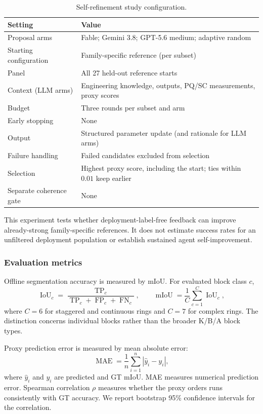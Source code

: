 \documentclass[a4paper,fleqn]{cas-dc}
\begin{document}
{\begin{table}[ht]
\caption{Self-refinement study configuration.}
\label{tab:poc-config}
\centering
\begin{tabular}{p{} p{}}
\toprule
Setting & Value \\
\midrule
Proposal arms & Fable; Gemini 3.8; GPT-5.6 medium; adaptive random \\
Starting configuration & Family-specific reference (per subset) \\
Panel & All 27 held-out reference starts \\
Context (LLM arms) & Engineering knowledge, outputs, PQ/SC measurements, proxy scores \\
Budget & Three rounds per subset and arm \\
Early stopping & None \\
Output & Structured parameter update (and rationale for LLM arms) \\
Failure handling & Failed candidates excluded from selection \\
Selection & Highest proxy score, including the start; ties within $0.01$ keep earlier \\
Separate coherence gate & None \\
\bottomrule
\end{tabular}
\end{table}

This experiment tests whether deployment-label-free feedback can improve already-strong family-specific references. It does not estimate success rates for an unfiltered deployment population or establish sustained agent self-improvement.


\subsubsection{Evaluation metrics}
\label{sec:metrics}

Offline segmentation accuracy is measured by mIoU. For evaluated block class $c$,
\begin{equation}
\operatorname{IoU}_c
=
\frac{\operatorname{TP}_c}
{\operatorname{TP}_c+\operatorname{FP}_c+\operatorname{FN}_c},
\qquad
\operatorname{mIoU}
=
\frac{1}{C}\sum_{c=1}^{C}\operatorname{IoU}_c,
\end{equation}
where $C=6$ for staggered and continuous rings and $C=7$ for complex rings. The distinction concerns individual blocks rather than the broader K/B/A block types.

Proxy prediction error is measured by mean absolute error:
\begin{equation}
\operatorname{MAE}
=
\frac{1}{n}\sum_{i=1}^{n}
|\hat{y}_i-y_i|,
\end{equation}
where $\hat{y}_i$ and $y_i$ are predicted and GT mIoU. MAE measures numerical prediction error. Spearman correlation $\rho$ measures whether the proxy orders runs consistently with GT accuracy. We report bootstrap 95\% confidence intervals for the correlation.

}
\end{document}
